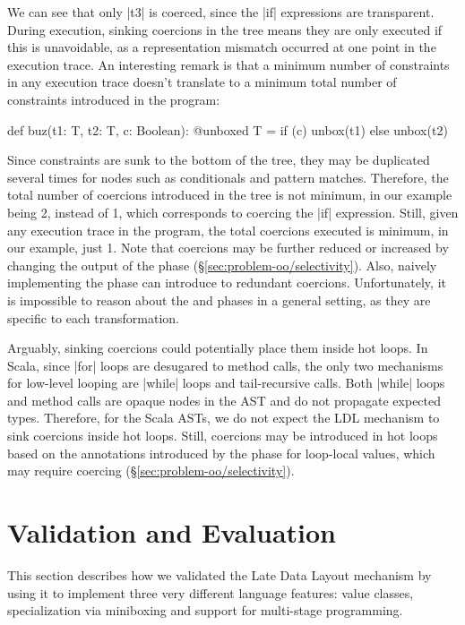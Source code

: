 We can see that only |t3| is coerced, since the |if| expressions are transparent. During execution, sinking coercions in the tree means they are only executed if this is unavoidable, as a representation mismatch occurred at one point in the execution trace. An interesting remark is that a minimum number of constraints in any execution trace doesn't translate to a minimum total number of constraints introduced in the program:

\begin{lstlisting-nobreak}
def buz(t1: T, t2: T, c: Boolean): @unboxed T =
  if (c)
    unbox(t1)
  else
    unbox(t2)
\end{lstlisting-nobreak}

Since constraints are sunk to the bottom of the tree, they may be duplicated several times for nodes such as conditionals and pattern matches. Therefore, the total number of coercions introduced in the tree is not minimum, in our example being 2, instead of 1, which corresponds to coercing the |if| expression. Still, given any execution trace in the program, the total coercions executed is minimum, in our example, just 1. Note that coercions may be further reduced or increased by changing the output of the \inject{} phase (\S\ref{sec:problem-oo/selectivity}). Also, naively implementing the \commit{} phase can introduce to redundant coercions. Unfortunately, it is impossible to reason about the \inject{} and \commit{} phases in a general setting, as they are specific to each transformation.

Arguably, sinking coercions could potentially place them inside hot loops. In Scala, since |for| loops are desugared to method calls, the only two mechanisms for low-level looping are |while| loops and tail-recursive calls. Both |while| loops and method calls are opaque nodes in the AST and do not propagate expected types. Therefore, for the Scala ASTs, we do not expect the LDL mechanism to sink coercions inside hot loops. Still, coercions may be introduced in hot loops based on the annotations introduced by the \inject{} phase for loop-local values, which may require coercing (\S\ref{sec:problem-oo/selectivity}).

\section{Validation and Evaluation}
\label{sec:validation}

This section describes how we validated the Late Data Layout mechanism by using it to implement three very different language features: value classes, specialization via miniboxing and support for multi-stage programming.

